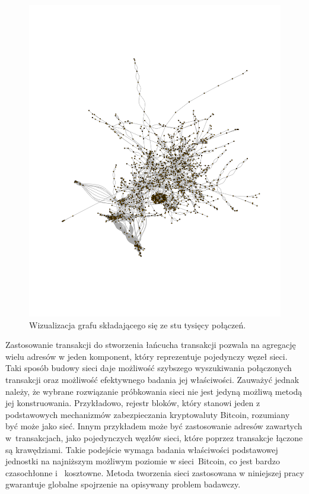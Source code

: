 \documentclass[12pt, oneside, final, openany]{mgr}
\begin{document}
\begin{figure}[H]
\begin{center}
\centering
\includegraphics[width=1\linewidth]{pictures/graph/graph.png}
\caption{Wizualizacja grafu składającego się ze stu tysięcy połączeń.}
\label{fig:graf}
\end{center}
\end{figure}

\if@archive\else{\newpage}\fi
\indent Zastosowanie transakcji do stworzenia łańcucha transakcji pozwala na agregację wielu adresów w jeden komponent, który reprezentuje pojedynczy węzeł sieci. Taki sposób budowy sieci  daje możliwość szybszego wyszukiwania połączonych transakcji oraz możliwość efektywnego badania jej właściwości. Zauważyć jednak należy, że wybrane rozwiązanie próbkowania sieci nie jest jedyną możliwą metodą jej konstruowania. Przykładowo, rejestr bloków, który stanowi jeden z podstawowych mechanizmów zabezpieczania kryptowaluty Bitcoin, rozumiany być może jako sieć. Innym przykładem może być zastosowanie adresów zawartych w~transakcjach, jako pojedynczych węzłów sieci, które poprzez transakcje łączone są krawędziami. Takie podejście wymaga badania właściwości podstawowej jednostki na najniższym możliwym poziomie w sieci~Bitcoin, co jest bardzo czasochłonne i~ kosztowne. Metoda tworzenia sieci zastosowana w niniejszej pracy gwarantuje globalne spojrzenie na opisywany problem badawczy. 
\end{document}
